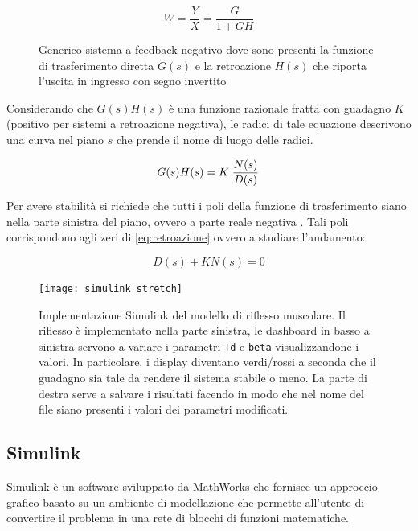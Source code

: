 \begin{equation}
	W=\frac{Y}{X}=\frac{G}{1+G H}
\end{equation}


\begin{figure}[t!]
	\centering
	\centering
\footnotesize{\def\svgwidth{0.95\linewidth}
	}
	\caption{Generico sistema a feedback negativo dove sono presenti la funzione di trasferimento diretta $G(s)$ e la retroazione $H(s)$ che riporta l'uscita in ingresso con segno invertito}
	\label{fig:sistema}
\end{figure}


Considerando che $G(s)H(s)$ è una funzione razionale fratta con guadagno $K$ (positivo per sistemi a retroazione negativa), le radici di tale equazione descrivono una curva nel piano $s$ che prende il nome di luogo delle radici. 

\begin{equation}
	G(s)H(s)=K\left.N(s)\over D(s)\right.
\end{equation}

Per avere stabilità si richiede che tutti i poli della funzione di trasferimento siano nella parte sinistra del piano, ovvero a parte reale negativa \cite{marro_controlli_2004}. Tali poli corrispondono agli zeri di \cref{eq:retroazione} ovvero a studiare l'andamento:

\begin{equation}
D(s)+KN(s)=0
\end{equation}


\begin{figure}[t!]
	\centering
	\texttt{[image: simulink\_stretch]}
	\caption{Implementazione Simulink del modello di riflesso muscolare. Il riflesso è implementato nella parte sinistra, le dashboard in basso a sinistra servono a variare i parametri \texttt{Td} e \texttt{beta} visualizzandone i valori. In particolare, i display diventano verdi/rossi a seconda che il guadagno sia tale da rendere il sistema stabile o meno. La parte di destra serve a salvare i risultati facendo in modo che nel nome del file siano presenti i valori dei parametri modificati.}
	\label{fig:simulink_stretch}
\end{figure}

\subsection{Simulink}

Simulink \cite{simulink} è un software sviluppato da MathWorks che fornisce un approccio grafico basato su un ambiente di modellazione che permette all’utente di convertire il problema in una rete di blocchi di funzioni matematiche.

